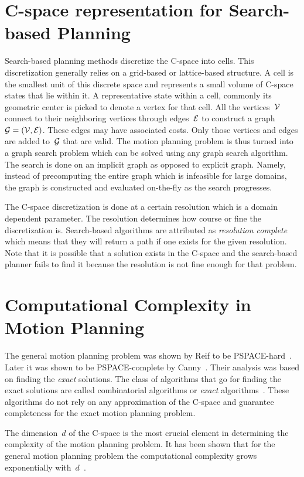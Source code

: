\documentclass[a4paper]{report}
\begin{document}
\section{C-space representation for Search-based Planning}
\label{sec:sbp}
Search-based planning methods discretize the C-space into cells. This discretization generally relies on a grid-based or lattice-based structure. A cell is the smallest unit of this discrete space and represents a small volume of C-space states that lie within it. A representative state within a cell, commonly its geometric center is picked to denote a vertex for that cell. All the vertices~$\mathcal{V}$ connect to their neighboring vertices through edges~$\mathcal{E}$ to construct a graph~$\mathcal{G} = (\mathcal{V}, \mathcal{E})$. These edges may have associated costs. Only those vertices and edges are added to~$\mathcal{G}$ that are valid. The motion planning problem is thus turned into a graph search problem which can be solved using any graph search algorithm. The search is done on an implicit graph as opposed to explicit graph. Namely, instead of precomputing the entire graph which is infeasible for large domains, the graph is constructed and evaluated on-the-fly as the search progresses.

The C-space discretization is done at a certain resolution which is a domain dependent parameter. The resolution determines how course or fine the discretization is. Search-based algorithms are attributed as \emph{resolution complete} which means that they will return a path if one exists for the given resolution. Note that it is possible that a solution exists in the C-space and the search-based planner fails to find it because the resolution is not fine enough for that problem.

\section{Computational Complexity in Motion Planning}
The general motion planning problem was shown by Reif to be PSPACE-hard~\cite{reif1979complexity}. Later it was shown to be PSPACE-complete by Canny~\cite{canny1988complexity}. Their analysis was based on finding the \emph{exact} solutions. The class of algorithms that go for finding the exact solutions are called combinatorial algorithms or \emph{exact} algorithms~\cite{lavalle2006planning}. These algorithms do not rely on any approximation of the C-space and guarantee completeness for the exact motion planning problem.

The dimension~$d$ of the C-space is the most crucial element in determining the complexity of the motion planning problem. It has been shown that for the general motion planning problem the computational complexity grows exponentially with~$d$~\cite{chazelle1991singly}.
\end{document}
